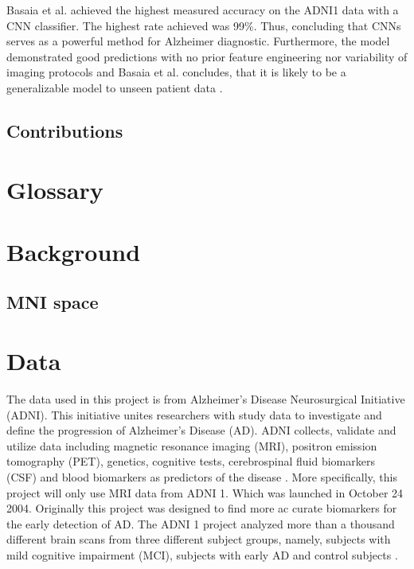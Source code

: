 \documentclass[12pt, fleqn, titlepage]{article}
\begin{document}
Basaia et al. achieved the highest measured accuracy on the ADNI1 data with a CNN classifier. The highest rate achieved was 99\%. Thus, concluding that CNNs serves as a powerful method for Alzheimer diagnostic. Furthermore, the model demonstrated good predictions with no prior feature engineering nor variability of imaging protocols and Basaia et al. concludes, that it is likely to be a generalizable model to unseen patient data \cite{neuro}. 

\subsection{Contributions}

\section{Glossary}

\section{Background}

\subsection{MNI space}

\section{Data} 


The data used in this project is from Alzheimer's Disease Neurosurgical Initiative (ADNI). This initiative unites researchers with study data to investigate and define the progression of Alzheimer's Disease (AD). 
ADNI collects, validate and utilize data including magnetic resonance imaging (MRI), positron emission tomography (PET), genetics, cognitive tests, cerebrospinal fluid biomarkers (CSF) and blood biomarkers as predictors of the disease \cite{adni}.
More specifically, this project will only use MRI data from ADNI 1. 
Which was launched in October 24 2004. Originally this project was designed to find more ac curate biomarkers for the early detection of AD.
The ADNI 1 project analyzed more than a thousand different brain scans from three different subject groups, namely, subjects with mild cognitive impairment (MCI), subjects with early AD and control subjects \cite{adni1}. 
\end{document}
